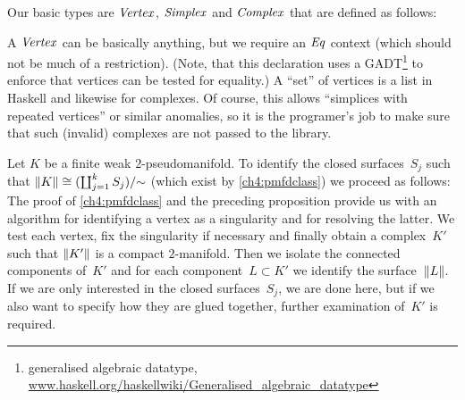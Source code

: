 Our basic types are \ensuremath{\Conid{Vertex}}, \ensuremath{\Conid{Simplex}} and \ensuremath{\Conid{Complex}} that are defined as
follows:
\resethooks
A \ensuremath{\Conid{Vertex}} can be basically anything, but we require an \ensuremath{\Conid{Eq}} context
(which should not be much of a restriction). (Note, that this declaration
uses a GADT\footnote{generalised algebraic datatype,
\href{http://www.haskell.org/haskellwiki/Generalised_algebraic_datatype}{%
\url{www.haskell.org/haskellwiki/Generalised_algebraic_datatype}}}
to enforce that vertices can be tested for equality.) A \enquote{set}
of vertices is a list in Haskell and likewise for complexes. Of course,
this allows \enquote{simplices with repeated vertices} or similar anomalies,
so it is the programer's job to make sure that such (invalid) complexes
are not passed to the library.

Let $K$ be a finite weak $2$-pseudomanifold. To identify the closed
surfaces~$S_j$ such that $\lVert K\rVert \cong (\coprod_{j=1}^k S_j)/{\sim}$ 
(which exist by \cref{ch4:pmfdclass}) we proceed as follows:
The proof of \cref{ch4:pmfdclass} and the preceding proposition provide us with an
algorithm for identifying a vertex as a singularity and for resolving the
latter. We test each vertex, fix the singularity if necessary and finally
obtain a complex~$K'$ such that $\lVert K'\rVert$ is a compact $2$-manifold. Then
we isolate the connected components of~$K'$ and for each component~$L\subset K'$
we identify the surface~$\lVert L\rVert$. If we are only interested in the closed
surfaces~$S_j$, we are done here, but if we also want to specify how they
are glued together, further examination of~$K'$ is required.

